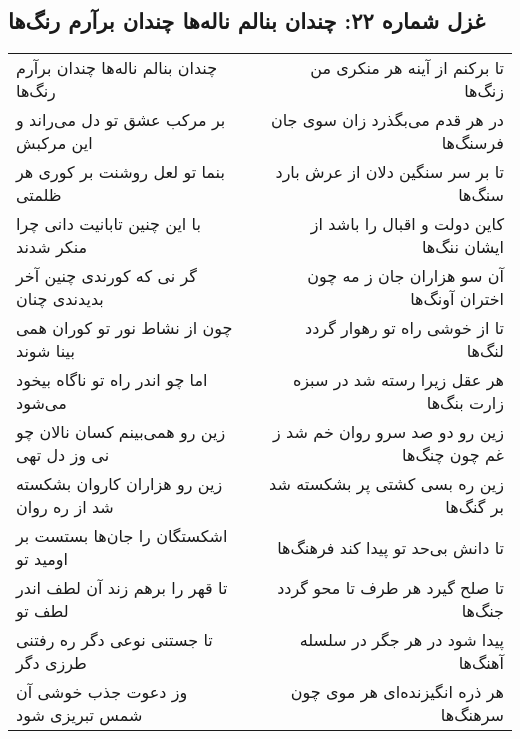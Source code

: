 \begin{center}
\section*{غزل شماره ۲۲: چندان بنالم ناله‌ها چندان برآرم رنگ‌ها}
\label{sec:0022}
\begin{longtable}{l p{0.5cm} r}
چندان بنالم ناله‌ها چندان برآرم رنگ‌ها
&&
تا برکنم از آینه هر منکری من زنگ‌ها
\\
بر مرکب عشق تو دل می‌راند و این مرکبش
&&
در هر قدم می‌بگذرد زان سوی جان فرسنگ‌ها
\\
بنما تو لعل روشنت بر کوری هر ظلمتی
&&
تا بر سر سنگین دلان از عرش بارد سنگ‌ها
\\
با این چنین تابانیت دانی چرا منکر شدند
&&
کاین دولت و اقبال را باشد از ایشان ننگ‌ها
\\
گر نی که کورندی چنین آخر بدیدندی چنان
&&
آن سو هزاران جان ز مه چون اختران آونگ‌ها
\\
چون از نشاط نور تو کوران همی بینا شوند
&&
تا از خوشی راه تو رهوار گردد لنگ‌ها
\\
اما چو اندر راه تو ناگاه بیخود می‌شود
&&
هر عقل زیرا رسته شد در سبزه زارت بنگ‌ها
\\
زین رو همی‌بینم کسان نالان چو نی وز دل تهی
&&
زین رو دو صد سرو روان خم شد ز غم چون چنگ‌ها
\\
زین رو هزاران کاروان بشکسته شد از ره روان
&&
زین ره بسی کشتی پر بشکسته شد بر گنگ‌ها
\\
اشکستگان را جان‌ها بستست بر اومید تو
&&
تا دانش بی‌حد تو پیدا کند فرهنگ‌ها
\\
تا قهر را برهم زند آن لطف اندر لطف تو
&&
تا صلح گیرد هر طرف تا محو گردد جنگ‌ها
\\
تا جستنی نوعی دگر ره رفتنی طرزی دگر
&&
پیدا شود در هر جگر در سلسله آهنگ‌ها
\\
وز دعوت جذب خوشی آن شمس تبریزی شود
&&
هر ذره انگیزنده‌ای هر موی چون سرهنگ‌ها
\\
\end{longtable}
\end{center}
